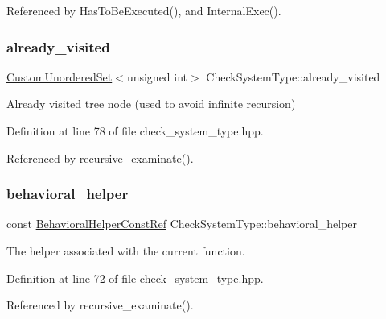 Referenced by Has\+To\+Be\+Executed(), and Internal\+Exec().

\mbox{\label{classCheckSystemType_a4d19149dc31efdcd6f339aa958602ef5}} 
\subsubsection{\texorpdfstring{already\+\_\+visited}{already\_visited}}
{\footnotesize\ttfamily \hyperlink{classCustomUnorderedSet}{Custom\+Unordered\+Set}$<$unsigned int$>$ Check\+System\+Type\+::already\+\_\+visited\hspace{0.3cm}{\ttfamily [private]}}



Already visited tree node (used to avoid infinite recursion) 



Definition at line 78 of file check\+\_\+system\+\_\+type.\+hpp.



Referenced by recursive\+\_\+examinate().

\mbox{\label{classCheckSystemType_a28f0bdd5b247bb4f7b173e18dc44e1da}} 
\subsubsection{\texorpdfstring{behavioral\+\_\+helper}{behavioral\_helper}}
{\footnotesize\ttfamily const \hyperlink{behavioral__helper_8hpp_aae973b54cac87eef3b27442aa3e1e425}{Behavioral\+Helper\+Const\+Ref} Check\+System\+Type\+::behavioral\+\_\+helper\hspace{0.3cm}{\ttfamily [private]}}



The helper associated with the current function. 



Definition at line 72 of file check\+\_\+system\+\_\+type.\+hpp.



Referenced by recursive\+\_\+examinate().

